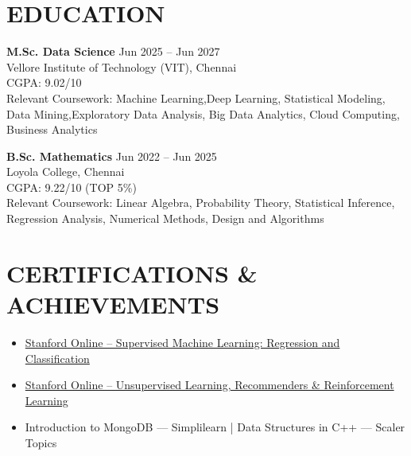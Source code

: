 \documentclass[10pt]{article}
\begin{document}
\section{EDUCATION}

\textbf{M.Sc. Data Science} \hfill Jun 2025 -- Jun 2027 \\
Vellore Institute of Technology (VIT), Chennai \\
CGPA: 9.02/10 \\
Relevant Coursework: Machine Learning,Deep Learning, Statistical Modeling, Data Mining,Exploratory Data Analysis, Big Data Analytics, Cloud Computing, Business Analytics

\vspace{2pt}

\textbf{B.Sc. Mathematics} \hfill Jun 2022 -- Jun 2025 \\
Loyola College, Chennai \\
CGPA: 9.22/10  (TOP 5\%) \\
Relevant Coursework: Linear Algebra, Probability Theory, Statistical Inference, Regression Analysis, Numerical Methods, Design and Algorithms

\vspace{2pt}


\section{CERTIFICATIONS \& ACHIEVEMENTS}

\begin{itemize}[noitemsep,topsep=0pt]

\item \href{https://drive.google.com/file/d/1yJT2jkJFie06i25hVI5RVy8bI3PsvwSG/view?usp=sharing}{Stanford Online -- Supervised Machine Learning: Regression and Classification}

\item \href{https://drive.google.com/file/d/1zBYKfgWuYcsw2kUUHA_WfpUXbbQvVk0h/view?usp=sharing}{Stanford Online -- Unsupervised Learning, Recommenders \& Reinforcement Learning}


\item 	Introduction to MongoDB — Simplilearn |
Data Structures in C++ — Scaler Topics




\end{itemize}
\end{document}

